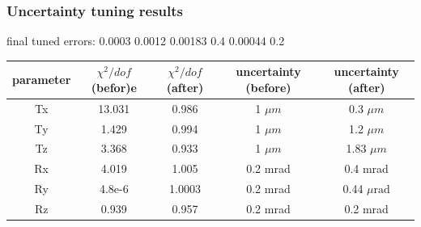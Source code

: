 \documentclass[aspectratio=1610, 12pt]{beamer}
\begin{document}
\begin{frame}\frametitle{Uncertainty tuning results}
  final tuned errors: 0.0003 0.0012 0.00183 0.4 0.00044 0.2
  \begin{table}
    \centering
    \begin{tabular}{c | c c || c c}
      \hline
      parameter & $\chi^2 / dof$ (befor)e & $\chi^2 / dof$ (after) & uncertainty (before) & uncertainty (after) \\
      \hline
      Tx & 13.031 & 0.986  & 1 $\mu m$ & 0.3 $\mu m$ \\
      Ty & 1.429 & 0.994   & 1 $\mu m$ & 1.2 $\mu m$ \\
      Tz & 3.368 & 0.933   & 1 $\mu m$ & 1.83 $\mu m$ \\
      Rx & 4.019 & 1.005   & 0.2 mrad & 0.4 mrad \\
      Ry & 4.8e-6 & 1.0003 & 0.2 mrad & 0.44 $\mu \text{rad}$ \\
      Rz & 0.939 & 0.957   & 0.2 mrad & 0.2 mrad \\
      \hline
    \end{tabular}
  \end{table}
\end{frame}
\end{document}
